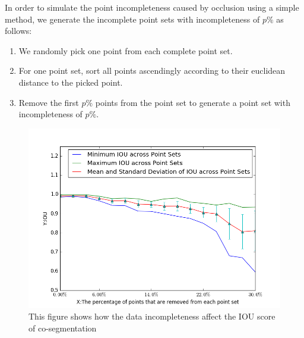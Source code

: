 In order to simulate the point incompleteness caused by occlusion using a simple method, we generate the incomplete point sets with incompleteness of $p\%$ as follows:
\begin{enumerate}
	\item We randomly pick one point from each complete point set. 
	\item For one point set, sort all points ascendingly according to their euclidean distance to the picked point.  
	\item Remove the first $p\%$ points from the point set to generate a point set with incompleteness of $p\%$.
\end{enumerate}
\begin{figure}
	\centering
	\includegraphics[width=\linewidth]{images/incompleteness/IOU.png}
	\caption{This figure shows how the data incompleteness affect the IOU score of co-segmentation}
	\label{fig:incompleteness}
\end{figure}
